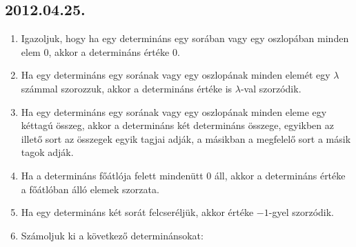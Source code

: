 \subsection*{2012.04.25.}
\begin{enumerate}
\item Igazoljuk, hogy ha egy determináns egy sorában vagy egy oszlopában minden elem 0, akkor a determináns értéke 0.
\item Ha egy determináns egy sorának vagy egy oszlopának minden elemét egy $\lambda$ számmal szorozzuk, akkor a determináns értéke is $\lambda$-val szorzódik.
\item Ha egy determináns egy sorának vagy egy oszlopának minden eleme egy kéttagú összeg, akkor a determináns két determináns összege, egyikben az illető sort az összegek egyik tagjai adják, a másikban a megfelelő sort a másik tagok adják.
\item Ha a determináns főátlója felett mindenütt 0 áll, akkor a determináns értéke a főátlóban álló elemek szorzata.
\item Ha egy determináns két sorát felcseréljük, akkor értéke $-1$-gyel szorzódik.
\item Számoljuk ki a következő determinánsokat:
\end{enumerate}

